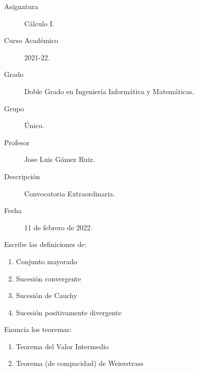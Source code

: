\documentclass[12pt]{article}
\begin{document}

    
    

    \begin{description}
        \item[Asignatura] Cálculo I.
        \item[Curso Académico] 2021-22.
        \item[Grado] Doble Grado en Ingeniería Informática y Matemáticas.
        \item[Grupo] Único.
        \item[Profesor] Jose Luis Gámez Ruiz.
        \item[Descripción] Convocatoria Extraordinaria.
        \item[Fecha] 11 de febrero de 2022.
    
    \end{description}
    \newpage

    \begin{ejercicio}[1 punto]
        Escribe las definiciones de:
        \begin{enumerate}
            \item Conjunto mayorado
            \item Sucesión convergente
            \item Sucesión de Cauchy
            \item Sucesión positivamente divergente
        \end{enumerate}
    \end{ejercicio}

    \begin{ejercicio}[1 punto]
        Enuncia los teoremas:
        \begin{enumerate}
            \item Teorema del Valor Intermedio
            \item Teorema (de compacidad) de Weierstrass
        \end{enumerate}
    \end{ejercicio}
\end{document}

